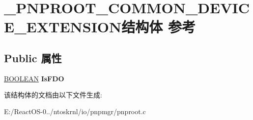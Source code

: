 \hypertarget{struct___p_n_p_r_o_o_t___c_o_m_m_o_n___d_e_v_i_c_e___e_x_t_e_n_s_i_o_n}{}\section{\+\_\+\+P\+N\+P\+R\+O\+O\+T\+\_\+\+C\+O\+M\+M\+O\+N\+\_\+\+D\+E\+V\+I\+C\+E\+\_\+\+E\+X\+T\+E\+N\+S\+I\+O\+N结构体 参考}
\label{struct___p_n_p_r_o_o_t___c_o_m_m_o_n___d_e_v_i_c_e___e_x_t_e_n_s_i_o_n}
\subsection*{Public 属性}
\begin{DoxyCompactItemize}
\item 
\mbox{\label{struct___p_n_p_r_o_o_t___c_o_m_m_o_n___d_e_v_i_c_e___e_x_t_e_n_s_i_o_n_a490a2eb18742a3e8b069881f3c8a77bc}} 
\hyperlink{_processor_bind_8h_a112e3146cb38b6ee95e64d85842e380a}{B\+O\+O\+L\+E\+AN} {\bfseries Is\+F\+DO}
\end{DoxyCompactItemize}


该结构体的文档由以下文件生成\+:\begin{DoxyCompactItemize}
\item 
E\+:/\+React\+O\+S-\/0../ntoskrnl/io/pnpmgr/pnproot.\+c\end{DoxyCompactItemize}
